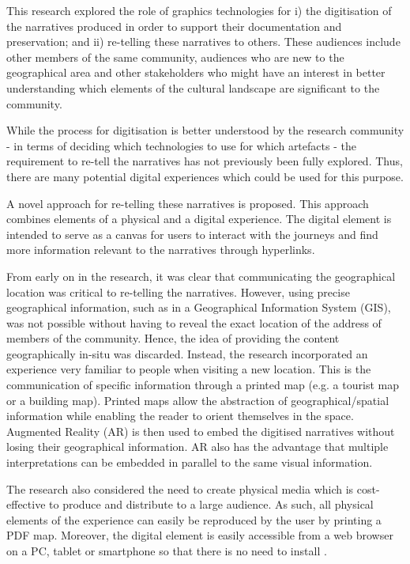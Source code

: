 \documentclass[acmlarge,screen,dvipsnames]{acmart}
\begin{document}
This research explored the role of graphics technologies for i) the
digitisation of the narratives produced in order to support their
documentation and preservation; and ii) re-telling these narratives to others.
These audiences include other members of the same community, audiences who are
new to the geographical area and other stakeholders who might have an interest
in better understanding which elements of the cultural landscape are
significant to the community.

While the process for digitisation is better understood by the research
community - in terms of deciding which technologies to use for which artefacts
- the requirement to re-tell the narratives has not previously been fully
explored. Thus, there are many potential digital experiences which could be
used for this purpose. 

A novel approach for re-telling these narratives is proposed. This approach
combines elements of a physical and a digital experience. The digital element
is intended to serve as a canvas for users to interact with the journeys and
find more information relevant to the narratives through hyperlinks. 

From early on in the research, it was clear that communicating the
geographical location was critical to re-telling the narratives. However,
using precise geographical information, such as in a Geographical Information
System (GIS), was not possible without having to reveal the exact location of
the address of members of the community. Hence, the idea of providing the
content geographically in-situ was discarded. Instead, the research
incorporated an experience very familiar to people when visiting a new
location. This is the communication of specific information through a printed
map (e.g. a tourist map or a building map). Printed maps allow the
abstraction of geographical/spatial information while enabling the reader to
orient themselves in the space. Augmented Reality (AR) is then used to embed
the digitised narratives without losing their geographical information. AR
also has the advantage that multiple interpretations can be embedded in
parallel to the same visual information. 

The research also considered the need to create physical media which is
cost-effective to produce and distribute to a large audience. As such, all
physical elements of the experience can easily be reproduced by the user by
printing a PDF map. Moreover, the digital element is easily accessible from a
web browser on a PC, tablet or smartphone so that there is no need to install
. 
\end{document}
